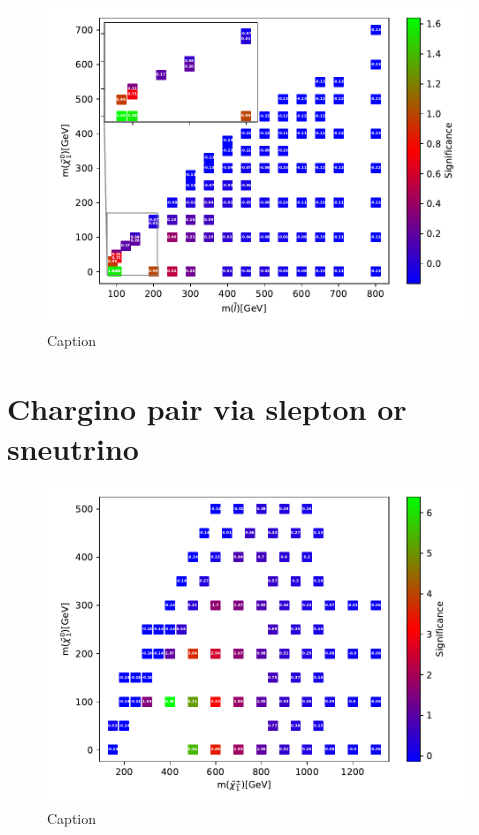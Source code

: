 \begin{figure}
    \centering
    \includegraphics[width = \textwidth]{Figures/Significances/significance_NN_slepslep_High_level.pdf}
    \caption{Caption}
    \label{fig:my_label}
\end{figure}















\section{Chargino pair via slepton or sneutrino}
\label{sec:resC1C1_SlepSnu}

\begin{figure}[H]
    \centering
    \includegraphics[width = \textwidth]{Figures/Significances/significanceCutandCount_slepsnu_all.pdf}
    \caption{Caption}
    \label{fig:my_label}
\end{figure}





